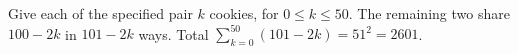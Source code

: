Give each of the specified pair $k$ cookies, for $0\le k\le50$. The remaining two share $100-2k$ in $101-2k$ ways. Total $\sum_{k=0}^{50}(101-2k)=51^2=\boxed{2601}$.
